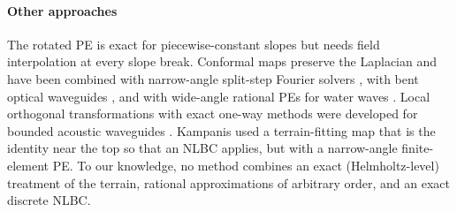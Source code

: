 \documentclass[journal]{IEEEtran}
\begin{document}
\paragraph*{Other approaches}
The rotated PE \cite{collins1990rotated,outing2006variable} is exact for
piecewise-constant slopes but needs field interpolation at every slope break.
Conformal maps preserve the Laplacian and have been combined with narrow-angle
split-step Fourier solvers \cite{dozier1984peruse,donohue1997apl}, with bent
optical waveguides \cite{heiblum1975conformal}, and with wide-angle rational PEs
for water waves \cite{kirby1994conformal}. Local orthogonal transformations with
exact one-way methods were developed for bounded acoustic waveguides
\cite{lu2001lot}. Kampanis \cite{kampanis2005} used a terrain-fitting map that
is the identity near the top so that an NLBC applies, but with a narrow-angle
finite-element PE. To our knowledge, no method combines an exact
(Helmholtz-level) treatment of the terrain, rational approximations of arbitrary
order, and an exact discrete NLBC.
\end{document}
